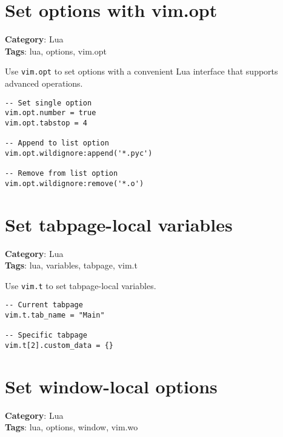 {{{{{{{\section{Set options with vim.opt}

\textbf{Category}: Lua\\ \textbf{Tags}: lua, options, vim.opt
\vspace{0.5cm}

Use {\footnotesize \Verb§vim.opt§} to set options with a convenient Lua interface that supports advanced operations.

\begin{Exa*}{}
\begin{Verbatim}[fontsize=\footnotesize, breaklines, breakanywhere]
-- Set single option
vim.opt.number = true
vim.opt.tabstop = 4

-- Append to list option
vim.opt.wildignore:append('*.pyc')

-- Remove from list option
vim.opt.wildignore:remove('*.o')
\end{Verbatim}
\end{Exa*}

\section{Set tabpage-local variables}

\textbf{Category}: Lua\\ \textbf{Tags}: lua, variables, tabpage, vim.t
\vspace{0.5cm}

Use {\footnotesize \Verb§vim.t§} to set tabpage-local variables.

\begin{Exa*}{}
\begin{Verbatim}[fontsize=\footnotesize, breaklines, breakanywhere]
-- Current tabpage
vim.t.tab_name = "Main"

-- Specific tabpage
vim.t[2].custom_data = {}
\end{Verbatim}
\end{Exa*}

\section{Set window-local options}

\textbf{Category}: Lua\\ \textbf{Tags}: lua, options, window, vim.wo
\vspace{0.5cm}

}}}}}}}
